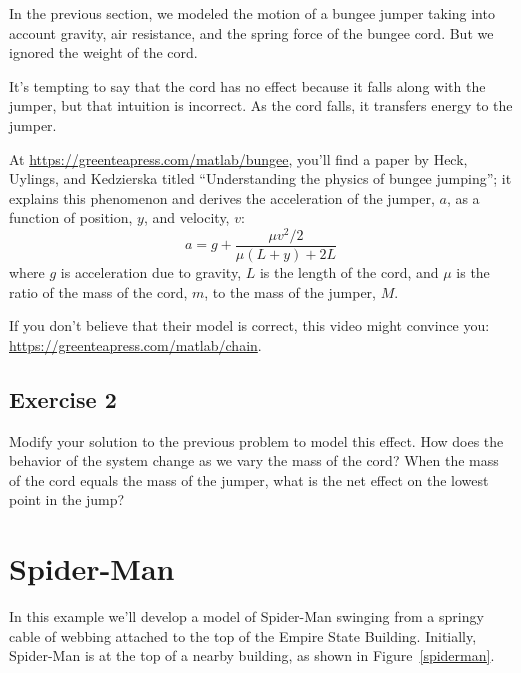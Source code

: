 
In the previous section, we modeled the motion of a bungee jumper taking into account gravity, air resistance, and the spring force of the bungee cord.  But we ignored the weight of the cord.


It's tempting to say that the cord has no effect because it falls along with the jumper, but that intuition is incorrect.  As the cord falls, it transfers energy to the jumper.


At \url{https://greenteapress.com/matlab/bungee}, you'll find a paper by Heck, Uylings, and Kedzierska titled ``Understanding the physics of bungee jumping''; it explains this phenomenon and derives the acceleration of the jumper, $a$, as a function of position, $y$, and velocity, $v$:
%
\[ a = g + \frac{\mu v^2/2}{\mu(L+y) + 2L} \]
%
where $g$ is acceleration due to gravity, $L$ is the length of the cord, and $\mu$ is the ratio of the mass of the cord, $m$, to the mass of the jumper, $M$.

If you don't believe that their model is correct, this video might convince you: \url{https://greenteapress.com/matlab/chain}.

\subsection{Exercise 2}

Modify your solution to the previous problem to model this effect.  How does the behavior of the system change as we vary the mass of the cord?  When the mass of the cord equals the mass of the jumper, what is the net effect on the lowest point in the jump?


\section{Spider-Man}

In this example we'll develop a model of Spider-Man swinging from a
springy cable of webbing attached to the top of the Empire State
Building.  Initially, Spider-Man is at the top of a nearby building, as
shown in  Figure~\ref{spiderman}.


